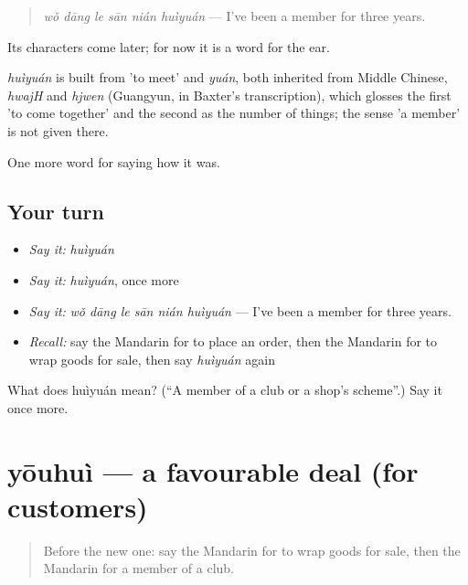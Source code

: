 \begin{quote}
\emph{wǒ dāng le sān nián huìyuán} — I've been a member for three years.
\end{quote}

Its characters come later; for now it is a word for the ear.

\begin{cousinweb}
\emph{huìyuán} is built from  'to meet' and \emph{yuán}, both inherited from Middle Chinese, \emph{hwajH} and \emph{hjwen} (Guangyun, in Baxter's transcription), which glosses the first 'to come together' and the second as the number of things; the sense 'a member' is not given there.
\end{cousinweb}

\begin{grammarlens}[title={What you've built}]
One more word for saying how it was.
\end{grammarlens}

\subsection*{Your turn}
\begin{itemize}
\raggedright
  \item \emph{Say it:} \emph{huìyuán}
  \item \emph{Say it:} \emph{huìyuán}, once more
  \item \emph{Say it:} \emph{wǒ dāng le sān nián huìyuán} — I've been a member for three years.
  \item \emph{Recall:} say the Mandarin for to place an order, then the Mandarin for to wrap goods for sale, then say \emph{huìyuán} again
\end{itemize}

\begin{tcolorbox}[breakable,colback=teal!4,colframe=teal!35!black,title={Before you move on}]
What does huìyuán mean? (\textquotedblleft{}A member of a club or a shop's scheme\textquotedblright{}.) Say it once more.
\end{tcolorbox}
\section[yōuhuì]{yōuhuì — a favourable deal (for customers)}

\label{lesson:ZH-C527-youhui}



\begin{quote}
Before the new one: say the Mandarin for to wrap goods for sale, then the Mandarin for a member of a club.
\end{quote}

